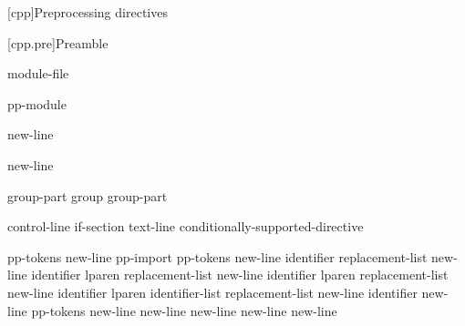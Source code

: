 [cpp]{Preprocessing directives}%

%
%


[cpp.pre]{Preamble}

\begin{bnf}
\br
    \br
    module-file
\end{bnf}

\begin{bnf}
\br
     pp-module  
\end{bnf}

\begin{bnf}
\br
     \terminal{;} new-line 
\end{bnf}

\begin{bnf}
\br
     \terminal{:}  \terminal{;} new-line 
\end{bnf}

\begin{bnf}
\br
    group-part\br
    group group-part
\end{bnf}

\begin{bnf}
\br
    control-line\br
    if-section\br
    text-line\br
    \terminal{\#} conditionally-supported-directive
\end{bnf}

\begin{bnf}\obeyspaces
{}\br
     pp-tokens new-line\br
    pp-import\br
     pp-tokens new-line\br
     identifier replacement-list new-line\br
     identifier lparen  \terminal{)} replacement-list new-line\br
     identifier lparen  replacement-list new-line\br
     identifier lparen identifier-list  replacement-list new-line\br
     identifier new-line\br
     pp-tokens new-line\br
      new-line\br
      new-line\br
      new-line\br
    \terminal{\# }new-line
\end{bnf}


